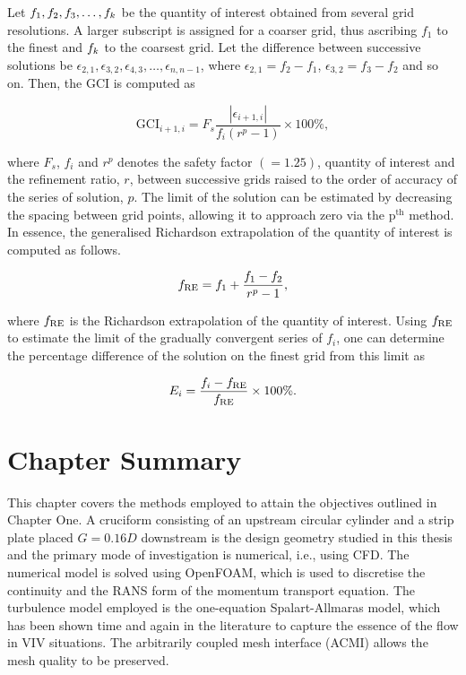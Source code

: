 \documentclass[oneside]{utmthesis}
\begin{document}
Let $f_{1},f_{2},f_{3},\dots,f_{k}$ be the quantity of interest obtained from several grid resolutions. A larger subscript is assigned for a coarser grid, thus ascribing $f_{1}$ to the finest and $f_{k}$ to the coarsest grid. Let the difference between successive solutions be $\epsilon_{2,1},\epsilon_{3,2},\epsilon_{4,3},\dots,\epsilon_{n,n-1}$, where $\epsilon_{2,1} = f_{2} - f_{1}$, $\epsilon_{3,2} = f_{3} - f_{2}$ and so on. Then, the GCI is computed as

\begin{equation}
  \text{GCI}_{i+1,i} = F_{s} \frac{\left |\epsilon_{i+1,i} \right |}{f_{i} \left ( r^{p} - 1 \right )} \times 100\%,
  \label{eq:gci}
\end{equation}

\noindent where $F_{s}$, $f_{i}$ and $r^{p}$ denotes the safety factor $\left ( = 1.25 \right )$, quantity of interest and the refinement ratio, $r$, between successive grids raised to the order of accuracy of the series of solution, $p$. The limit of the solution can be estimated by decreasing the spacing between grid points, allowing it to approach zero via the $\text{p}^{\text{th}}$ method. In essence, the generalised Richardson extrapolation of the quantity of interest is computed as follows.

\begin{equation}
  f_{\text{RE}} = f_{1} + \frac{f_{1} - f_{2}}{r^{p} - 1},
  \label{eq:richardsonExtrapolation}
\end{equation}

\noindent where $f_{\text{RE}}$ is the Richardson extrapolation of the quantity of interest. Using $f_{\text{RE}}$ to estimate the limit of the gradually convergent series of $f_{i}$, one can determine the percentage difference of the solution on the finest grid from this limit as

\begin{equation}
  E_{i} = \frac{f_{i} - f_{\text{RE}}}{f_{\text{RE}}} \times 100\%.
  \label{eq:percentageDifference}
\end{equation}

\section{Chapter Summary} \label{sec:chapSumMethod}
This chapter covers the methods employed to attain the objectives outlined in Chapter One. A cruciform consisting of an upstream circular cylinder and a strip plate placed $G=0.16D$ downstream is the design geometry studied in this thesis and the primary mode of investigation is numerical, i.e., using CFD. The numerical model is solved using OpenFOAM, which is used to discretise the continuity and the RANS form of the momentum transport equation. The turbulence model employed is the one-equation Spalart-Allmaras model, which has been shown time and again in the literature to capture the essence of the flow in VIV situations. The arbitrarily coupled mesh interface (ACMI) allows the mesh quality to be preserved.
\end{document}
